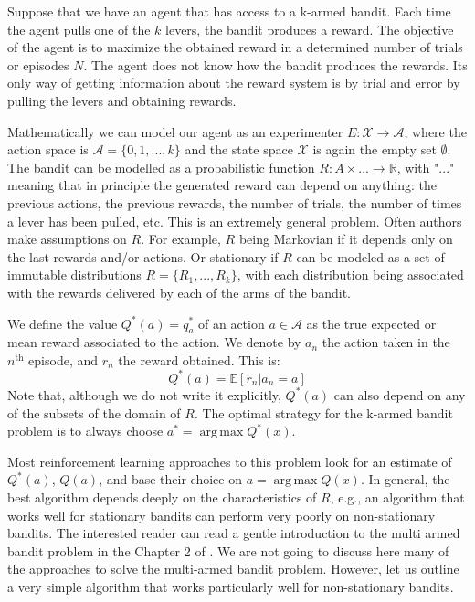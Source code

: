 \documentclass[11pt,a4paper,twoside]{report}
\DeclareMathOperator*{\argmax}{arg\,max}
\newcommand{\+}{\textnormal{+} }
\theoremstyle{definition}
\numberwithin{equation}{chapter}
\begin{document}
Suppose that we have an agent that has access to a k-armed bandit. Each time the
agent pulls one of the $k$ levers, the bandit produces a reward. The objective
of the agent is to maximize the obtained reward in a determined number of trials
or episodes $N$. The agent does not know how the bandit produces the rewards. Its
only way of getting information about the reward system is by trial and error by
pulling the levers and obtaining rewards.

Mathematically we can model our agent as an experimenter
$E:\mathcal{X}\rightarrow\mathcal{A}$, where the action space is
$\mathcal{A}=\{0,1,...,k\}$ and the state space $\mathcal{X}$ is again the empty
set $\emptyset$. The bandit can be modelled as a probabilistic function
$R:A\times ... \rightarrow \mathbb{R}$, with "$...$" meaning that in principle
the generated reward can depend on anything: the previous actions, the previous
rewards, the number of trials, the number of times a lever has been pulled, etc.
This is an extremely general problem. Often authors make assumptions on $R$. For
example, $R$ being Markovian if it depends only on the last rewards and/or actions.
Or stationary if $R$ can be modeled as a set of immutable distributions
$R=\{R_1,... , R_k\}$, with each distribution being associated with the rewards
delivered by each of the arms of the bandit.

We define the value $Q^*(a)=q^*_a$ of an action $a \in \mathcal{A}$ as the true
expected or mean reward associated to the action. We denote by $a_n$ the action
taken in the $n^\text{th}$ episode, and $r_n$ the reward obtained. This is:
\begin{equation}
  Q^*(a) = \mathbb{E}[r_n|a_n = a]
\end{equation}
Note that, although we do not write it explicitly, $Q^*(a)$ can also depend on 
any of the subsets of the domain of $R$.
The optimal strategy for the k-armed bandit problem is to always choose 
$a^*=\argmax Q^*(x)$.

Most reinforcement learning approaches to this problem look for an estimate of
$Q^*(a)$, $Q(a)$, and base their choice on $a=\argmax Q(x)$. In general, the
best algorithm depends deeply on the characteristics of $R$, e.g., an algorithm
that works well for stationary bandits can perform very poorly on non-stationary
bandits. The interested reader can read a gentle introduction to the multi armed
bandit problem in the Chapter 2 of \cite{sutton2018reinforcement}. We are not
going to discuss here many of the approaches to solve the multi-armed bandit
problem. However, let us outline a very simple algorithm that works particularly
well for non-stationary bandits. 
\end{document}
